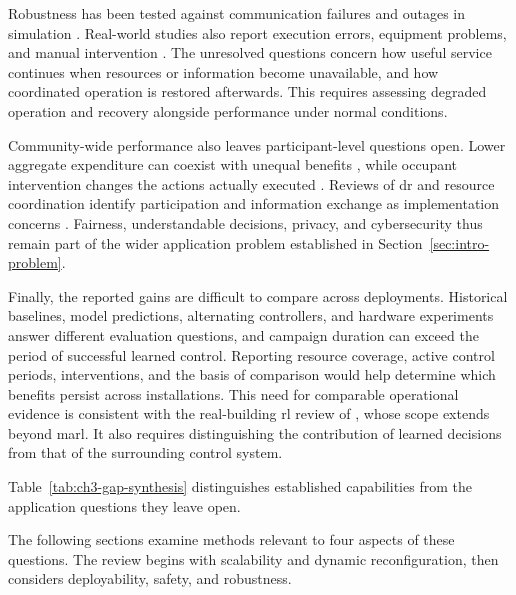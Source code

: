 Robustness has been tested against communication failures and outages in simulation \parencite{recC24,recC16}. Real-world studies also report execution errors, equipment problems, and manual intervention \parencite{wang2026buildingmarl,recP10}. The unresolved questions concern how useful service continues when resources or information become unavailable, and how coordinated operation is restored afterwards. This requires assessing degraded operation and recovery alongside performance under normal conditions.

Community-wide performance also leaves participant-level questions open. Lower aggregate expenditure can coexist with unequal benefits \parencite{recS02,wilk2024smartcommunity}, while occupant intervention changes the actions actually executed \parencite{hosseini2026cirlem}. Reviews of \gls{dr} and resource coordination identify participation and information exchange as implementation concerns \parencite{recN07,recV05}. Fairness, understandable decisions, privacy, and cybersecurity thus remain part of the wider application problem established in Section~\ref{sec:intro-problem}.

Finally, the reported gains are difficult to compare across deployments. Historical baselines, model predictions, alternating controllers, and hardware experiments answer different evaluation questions, and campaign duration can exceed the period of successful learned control. Reporting resource coverage, active control periods, interventions, and the basis of comparison would help determine which benefits persist across installations. This need for comparable operational evidence is consistent with the real-building \gls{rl} review of \textcite{kannari2025realbuildings}, whose scope extends beyond \gls{marl}. It also requires distinguishing the contribution of learned decisions from that of the surrounding control system.

\label{sec:ch3-gap-synthesis}
Table~\ref{tab:ch3-gap-synthesis} distinguishes established capabilities from the application questions they leave open.


The following sections examine methods relevant to four aspects of these questions. The review begins with scalability and dynamic reconfiguration, then considers deployability, safety, and robustness.

